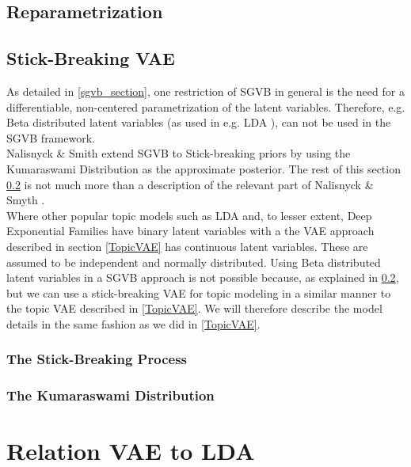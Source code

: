 \documentclass{report}
\begin{document}
\subsection{Reparametrization}\label{reparametrization}



\subsection{Stick-Breaking VAE}\label{sbvae_section}
As detailed in \ref{sgvb_section}, one restriction of SGVB in general is the need for a differentiable, non-centered parametrization of the latent variables. Therefore, e.g. Beta distributed latent variables (as used in e.g. LDA \cite{bleil2003latent}), can not be used in the SGVB framework. \\ Nalisnyck \& Smith extend SGVB to Stick-breaking priors by using the Kumaraswami Distribution as the approximate posterior. The rest of this section \ref{sbvae_section} is not much more than a description of the relevant part of Nalisnyck \& Smyth \cite{nalisnick2016deep}.\\ 
Where other popular topic models such as LDA \cite{blei2003latent} and, to lesser extent, Deep Exponential Families \cite{ranganath2015deep} have binary latent variables with a the VAE approach described in section \ref{TopicVAE} has continuous latent variables. These are assumed to be independent and normally distributed. Using Beta distributed latent variables in a SGVB approach is not possible because, as explained in \ref{sbvae_section}, but we can use a stick-breaking VAE for topic modeling in a similar manner to the topic VAE described in \ref{TopicVAE}. We will therefore describe the model details in the same fashion as we did in \ref{TopicVAE}. \\

\subsubsection{The Stick-Breaking Process}\label{sb_process}

\subsubsection{The Kumaraswami Distribution}\label{kum}


\section{Relation VAE to LDA}
\end{document}
